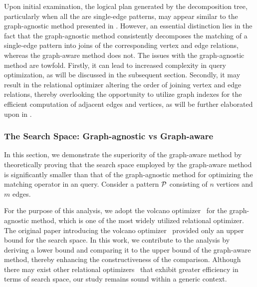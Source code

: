 \begin{example}
\end{example}

Upon initial examination, the logical plan generated by the decomposition tree, particularly when all the \mmcs are single-edge patterns,
may appear similar to the graph-agnostic method presented in . However, an essential distinction lies in the fact that the graph-agnostic method consistently decomposes the matching of a single-edge pattern into joins of the corresponding vertex and edge relations, whereas the graph-aware method does not. The issues with the graph-agnostic method are towfold. Firstly, it can lead to increased complexity in query optimization, as will be discussed in the subsequent section. Secondly, it may result in the relational optimizer altering the order of joining vertex and edge relations, thereby overlooking the opportunity to utilize graph indexes for the efficient computation of adjacent edges and vertices, as will be further elaborated upon in .

\subsubsection{The Search Space: Graph-agnostic vs Graph-aware}
\label{sec:compare-search-space}

In this section, we demonstrate the superiority of the graph-aware method by theoretically proving that the search space employed by the graph-aware method is significantly smaller than that of the graph-agnostic method for optimizing the matching operator in an \spjm query.
Consider a pattern $\mathcal{P}$ consisting of $n$ vertices and $m$ edges.

For the purpose of this analysis, we adopt the volcano optimizer~\cite{columbia} for the graph-agnostic method, which is one of the most widely utilized relational optimizer.
The original paper introducing the volcano optimizer~\cite{columbia} provided only an upper bound for the search space.
In this work, we contribute to the analysis by deriving a lower bound and comparing it to the upper bound of the graph-aware method, thereby enhancing the constructiveness of the comparison. Although there may exist other relational optimizers~\cite{xx} that exhibit greater efficiency in terms of search space, our study remains sound within a generic context.

